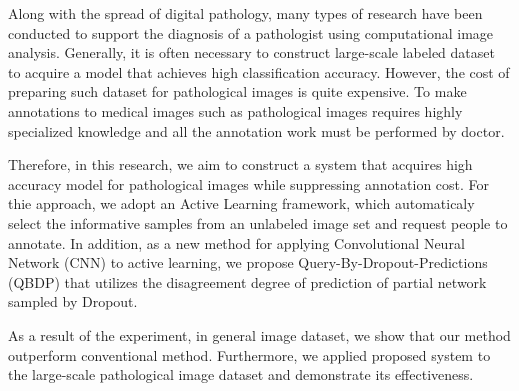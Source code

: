 Along with the spread of digital pathology, many types of research have been conducted to support the diagnosis of a pathologist using computational image analysis.
Generally, it is often necessary to construct large-scale labeled dataset to acquire a model that achieves high classification accuracy.
However, the cost of preparing such dataset for pathological images is quite expensive.
To make annotations to medical images such as pathological images requires highly specialized knowledge 
and all the annotation work must be performed by doctor.

Therefore, in this research, we aim to construct a system that acquires high accuracy model for pathological images while suppressing annotation cost.
For thie approach, we adopt an Active Learning framework, which automaticaly select the informative samples from an unlabeled image set and request people to annotate.
In addition, as a new method for applying Convolutional Neural Network (CNN) to active learning,
we propose Query-By-Dropout-Predictions (QBDP) that utilizes the disagreement degree of prediction of partial network sampled by Dropout.

As a result of the experiment, in general image dataset, we show that our method outperform conventional method.
Furthermore, we applied proposed system to the large-scale pathological image dataset and demonstrate its effectiveness.